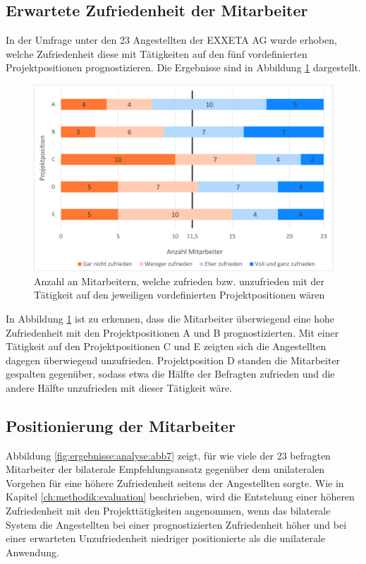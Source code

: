 \subsection{Erwartete Zufriedenheit der Mitarbeiter}
\label{ch:ergebnisse:fallstudie:umfrageMitarbeiter}
In der Umfrage unter den 23 Angestellten der EXXETA AG wurde erhoben, welche Zufriedenheit diese mit Tätigkeiten auf den fünf vordefinierten Projektpositionen prognostizieren. Die Ergebnisse sind in Abbildung \ref{fig:ergebnisse:fallstudie:abb1} dargestellt.

\begin{figure}[h]
	\centering
	\includegraphics[width=1\textwidth]{gfx/mitarbeiter-zufriedenheit-umfrage.png}
	\caption{Anzahl an Mitarbeitern, welche zufrieden bzw. unzufrieden mit der Tätigkeit auf den jeweiligen vordefinierten Projektpositionen wären}
	\label{fig:ergebnisse:fallstudie:abb1}
\end{figure}

In Abbildung \ref{fig:ergebnisse:fallstudie:abb1} ist zu erkennen, dass die Mitarbeiter überwiegend eine hohe Zufriedenheit mit den Projektpositionen A und B prognostizierten. Mit einer Tätigkeit auf den Projektpositionen C und E zeigten sich die Angestellten dagegen überwiegend unzufrieden. Projektposition D standen die Mitarbeiter gespalten gegenüber, sodass etwa die Hälfte der Befragten zufrieden und die andere Hälfte unzufrieden mit dieser Tätigkeit wäre.
\newpage
\subsection{Positionierung der Mitarbeiter}
\label{ch:ergebnisse:fallstudie:positionierungMitarbeiter}
Abbildung \ref{fig:ergebnisse:analyse:abb7} zeigt, für wie viele der 23 befragten Mitarbeiter der bilaterale Empfehlungsansatz gegenüber dem unilateralen Vorgehen für eine höhere Zufriedenheit seitens der Angestellten sorgte. Wie in Kapitel \ref{ch:methodik:evaluation} beschrieben, wird die Entstehung einer höheren Zufriedenheit mit den Projekttätigkeiten angenommen, wenn das bilaterale System die Angestellten bei einer prognostizierten Zufriedenheit höher und bei einer erwarteten Unzufriedenheit niedriger positionierte als die unilaterale Anwendung.

